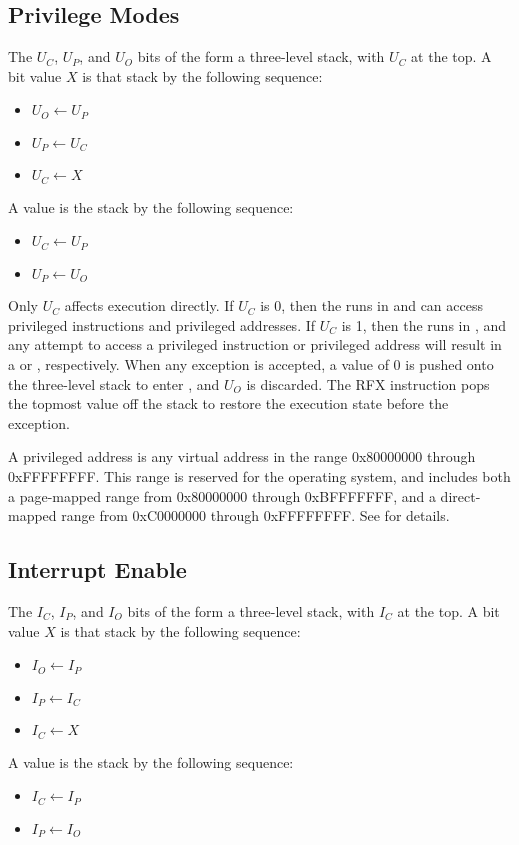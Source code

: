 \subsection{Privilege Modes}

The $U_C$, $U_P$, and $U_O$ bits of the \psw form a three-level stack, with $U_C$ at the top. A bit value $X$ is  that stack by the following sequence:
\begin{itemize}
\item[] $U_O \leftarrow U_P$
\item[] $U_P \leftarrow U_C$
\item[] $U_C \leftarrow X$
\end{itemize}
A value is  the stack by the following sequence:
\begin{itemize}
\item[] $U_C \leftarrow U_P$
\item[] $U_P \leftarrow U_O$
\end{itemize}

Only $U_C$ affects execution directly. If $U_C$ is 0, then the \eco runs in  and can access privileged instructions and privileged addresses. If $U_C$ is 1, then the \eco runs in , and any attempt to access a privileged instruction or privileged address will result in a  or , respectively. When any exception is accepted, a value of 0 is pushed onto the three-level stack to enter , and $U_O$ is discarded. The RFX instruction pops the topmost value off the stack to restore the execution state before the exception.

A privileged address is any virtual address in the range 0x80000000 through 0xFFFFFFFF. This range is reserved for the operating system, and includes both a page-mapped range from 0x80000000 through 0xBFFFFFFF, and a direct-mapped range from 0xC0000000 through 0xFFFFFFFF. See  for details.

\subsection{Interrupt Enable}

The $I_C$, $I_P$, and $I_O$ bits of the \psw form a three-level stack, with $I_C$ at the top. A bit value $X$ is  that stack by the following sequence:
\begin{itemize}
\item[] $I_O \leftarrow I_P$
\item[] $I_P \leftarrow I_C$
\item[] $I_C \leftarrow X$
\end{itemize}
A value is  the stack by the following sequence:
\begin{itemize}
\item[] $I_C \leftarrow I_P$
\item[] $I_P \leftarrow I_O$
\end{itemize}

